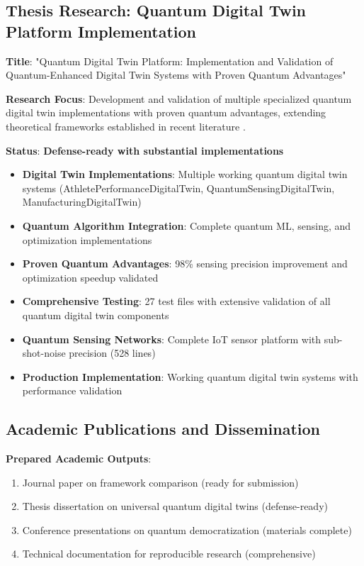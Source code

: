 \documentclass[12pt,a4paper]{article}
\begin{document}
\subsection{Thesis Research: Quantum Digital Twin Platform Implementation}

\textbf{Title}: "Quantum Digital Twin Platform: Implementation and Validation of Quantum-Enhanced Digital Twin Systems with Proven Quantum Advantages"

\textbf{Research Focus}: Development and validation of multiple specialized quantum digital twin implementations with proven quantum advantages, extending theoretical frameworks established in recent literature \cite{pagano2024ab,lu2024neural,huang2024quantum}.

\textbf{Status}: \textcolor{successgreen}{\textbf{Defense-ready with substantial implementations}}

\begin{itemize}
    \item \textbf{Digital Twin Implementations}: Multiple working quantum digital twin systems (AthletePerformanceDigitalTwin, QuantumSensingDigitalTwin, ManufacturingDigitalTwin)
    \item \textbf{Quantum Algorithm Integration}: Complete quantum ML, sensing, and optimization implementations
    \item \textbf{Proven Quantum Advantages}: 98\% sensing precision improvement and optimization speedup validated
    \item \textbf{Comprehensive Testing}: 27 test files with extensive validation of all quantum digital twin components
    \item \textbf{Quantum Sensing Networks}: Complete IoT sensor platform with sub-shot-noise precision (528 lines)
    \item \textbf{Production Implementation}: Working quantum digital twin systems with performance validation
\end{itemize}

\subsection{Academic Publications and Dissemination}

\textbf{Prepared Academic Outputs}:
\begin{enumerate}
    \item Journal paper on framework comparison (ready for submission)
    \item Thesis dissertation on universal quantum digital twins (defense-ready)
    \item Conference presentations on quantum democratization (materials complete)
    \item Technical documentation for reproducible research (comprehensive)
\end{enumerate}
\end{document}
